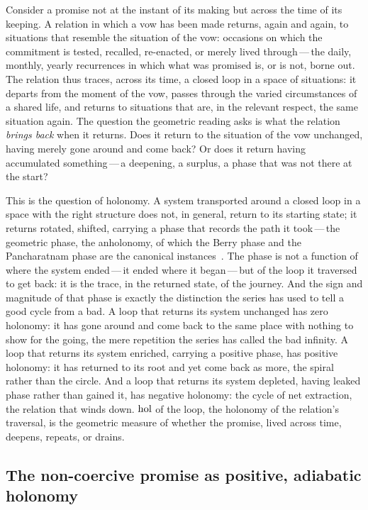 Consider a promise not at the instant of its making but across the time of its keeping. A relation in which a vow has been made returns, again and again, to situations that resemble the situation of the vow: occasions on which the commitment is tested, recalled, re-enacted, or merely lived through\,---\,the daily, monthly, yearly recurrences in which what was promised is, or is not, borne out. The relation thus traces, across its time, a closed loop in a space of situations: it departs from the moment of the vow, passes through the varied circumstances of a shared life, and returns to situations that are, in the relevant respect, the same situation again. The question the geometric reading asks is what the relation \emph{brings back} when it returns. Does it return to the situation of the vow unchanged, having merely gone around and come back? Or does it return having accumulated something\,---\,a deepening, a surplus, a phase that was not there at the start?

This is the question of holonomy. A system transported around a closed loop in a space with the right structure does not, in general, return to its starting state; it returns rotated, shifted, carrying a phase that records the path it took\,---\,the geometric phase, the anholonomy, of which the Berry phase and the Pancharatnam phase are the canonical instances~\parencite{berry1984,pancharatnam1956}. The phase is not a function of where the system ended\,---\,it ended where it began\,---\,but of the loop it traversed to get back: it is the trace, in the returned state, of the journey. And the sign and magnitude of that phase is exactly the distinction the series has used to tell a good cycle from a bad. A loop that returns its system unchanged has zero holonomy: it has gone around and come back to the same place with nothing to show for the going, the mere repetition the series has called the bad infinity. A loop that returns its system enriched, carrying a positive phase, has positive holonomy: it has returned to its root and yet come back as more, the spiral rather than the circle. And a loop that returns its system depleted, having leaked phase rather than gained it, has negative holonomy: the cycle of net extraction, the relation that winds down. $\operatorname{hol}$ of the loop, the holonomy of the relation's traversal, is the geometric measure of whether the promise, lived across time, deepens, repeats, or drains.

\subsection{The non-coercive promise as positive, adiabatic holonomy}
\label{p13:sub:holo-adiabatic}


